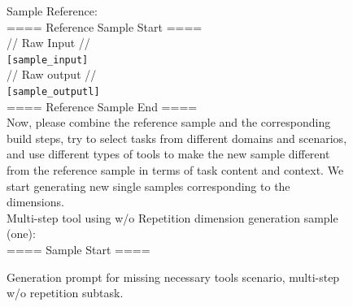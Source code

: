 \begin{figure}[!htb]
\begin{tcolorbox}[
    colback=white, 
    colframe=blue1, 
    boxrule=0.5mm,
    arc=0mm,
    outer arc=0mm,
    title=Missing Necessary Tools: Multi-step w/o Repetition - Generation Prompt
]
Sample Reference:\\
==== Reference Sample Start ====\\
// Raw Input //\\
\colorbox{blue1!50}{\texttt{[sample\_input]}}\\

// Raw output //\\
\colorbox{blue1!50}{\texttt{[sample\_outputl]}}\\
==== Reference Sample End ====\\

Now, please combine the reference sample and the corresponding build steps, try to select tasks from different domains and scenarios, and use different types of tools to make the new sample different from the reference sample in terms of task content and context. We start generating new single samples corresponding to the dimensions.\\
Multi-step tool using w/o Repetition dimension generation sample (one):\\
==== Sample Start ====
\end{tcolorbox}
\caption{Generation prompt for missing necessary tools scenario, multi-step w/o repetition subtask.}
\label{fig:multi-step-worep-prompt}
\end{figure}